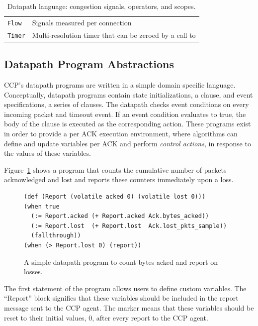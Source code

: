 \begin{table}
\begin{tabular}{@{} p{}p{}}
        \texttt{Flow} & Signals measured per connection \\
        \texttt{Timer} & Multi-resolution timer that can be zeroed by a call to \ct{reset} \\
    \end{tabular}
    \caption{Datapath language: congestion signals, operators, and scopes.}\label{tab:api}
\end{table}
\subsection{Datapath Program Abstractions}
%
\label{s:ccp:datapath_programs}
CCP's datapath programs are written in a simple domain specific language.
Conceptually, datapath programs contain state initializations, \ie a 
clause, and event specifications, \ie a series of  clauses.
The datapath checks event conditions on every incoming packet and timeout event.
If an event condition evaluates to true, the body of the  clause is executed as the corresponding
action.
These programs exist in order to provide a per ACK execution environment, where algorithms can define and update variables per ACK and perform \textit{control actions}, in response to the values of these variables.

Figure~\ref{lst:design:simple_datapath_prog} shows a program that counts the cumulative number of packets acknowledged and lost and reports these counters immediately upon a loss.
%
\begin{figure}[t]
{\footnotesize
\begin{verbatim}
(def (Report (volatile acked 0) (volatile lost 0)))
(when true
  (:= Report.acked (+ Report.acked Ack.bytes_acked))
  (:= Report.lost  (+ Report.lost  Ack.lost_pkts_sample))
  (fallthrough))
(when (> Report.lost 0) (report))
\end{verbatim}
\caption{A simple datapath program to count bytes acked and report on losses.} \label{lst:design:simple_datapath_prog}
}
\end{figure}
%
The first statement of the program allows users to define custom variables.
The ``Report'' block signifies that these variables should be included in the report message sent to the CCP agent.
The  marker means that these variables should be reset to their initial values, 0, after every report to the CCP agent.

